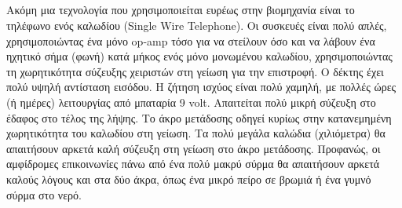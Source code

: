 \documentclass[12pt]{article}
\begin{document}
\begin{multicols*}{2}
    \subsection{}
        Ακόμη μια τεχνολογία που χρησιμοποιείται ευρέως στην βιομηχανία είναι το τηλέφωνο
        ενός καλωδίου (Single Wire Telephone). Οι συσκευές είναι πολύ απλές, χρησιμοποιώντας
        ένα μόνο op-amp τόσο για να στείλουν όσο και να λάβουν ένα ηχητικό σήμα (φωνή) κατά
        μήκος ενός μόνο μονωμένου καλωδίου, χρησιμοποιώντας τη χωρητικότητα σύζευξης χειριστών
        στη γείωση για την επιστροφή. Ο δέκτης έχει πολύ υψηλή αντίσταση εισόδου. Η ζήτηση
        ισχύος είναι πολύ χαμηλή, με πολλές ώρες (ή ημέρες) λειτουργίας από μπαταρία 9 volt.
        Απαιτείται πολύ μικρή σύζευξη στο έδαφος στο τέλος της λήψης. Το άκρο μετάδοσης οδηγεί
        κυρίως στην κατανεμημένη χωρητικότητα του καλωδίου στη γείωση. Τα πολύ μεγάλα καλώδια
        (χιλιόμετρα) θα απαιτήσουν αρκετά καλή σύζευξη στη γείωση στο άκρο μετάδοσης.
        Προφανώς, οι αμφίδρομες επικοινωνίες πάνω από ένα πολύ μακρύ σύρμα θα απαιτήσουν
        αρκετά καλούς λόγους και στα δύο άκρα, όπως ένα μικρό πείρο σε βρωμιά ή ένα γυμνό
        σύρμα στο νερό.

    \printbibliography
\end{multicols*}
\end{document}
